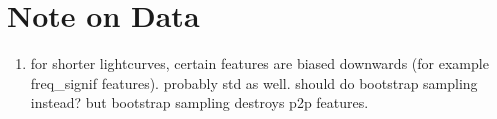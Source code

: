 \documentclass[11pt]{article}
\begin{document}
\section{Note on Data}
\begin{enumerate}
\item for shorter lightcurves, certain features are biased downwards (for example freq\_signif features). probably std as well. should do bootstrap sampling instead? but bootstrap sampling destroys p2p features.
\end{enumerate}




\end{document}
